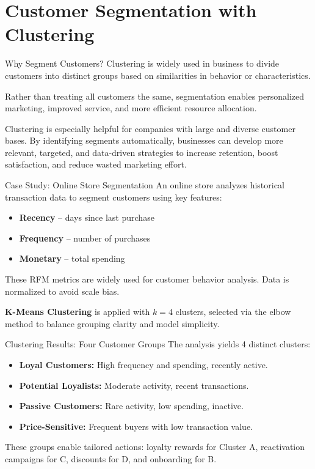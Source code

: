 \documentclass[aspectratio=169, table]{beamer}
\begin{document}
\section{Customer Segmentation with Clustering}

\begin{frame}{Why Segment Customers?}
	Clustering is widely used in business to divide customers into distinct groups based on similarities in behavior or characteristics. 
	
	Rather than treating all customers the same, segmentation enables personalized marketing, improved service, and more efficient resource allocation. 
	
	Clustering is especially helpful for companies with large and diverse customer bases. By identifying segments automatically, businesses can develop more relevant, targeted, and data-driven strategies to increase retention, boost satisfaction, and reduce wasted marketing effort.
\end{frame}

\begin{frame}{Case Study: Online Store Segmentation}
	An online store analyzes historical transaction data to segment customers using key features:
	
	\begin{itemize}
		\item \textbf{Recency} – days since last purchase
		\item \textbf{Frequency} – number of purchases
		\item \textbf{Monetary} – total spending
	\end{itemize}
	
	These RFM metrics are widely used for customer behavior analysis. Data is normalized to avoid scale bias. 
	
	\textbf{K-Means Clustering} is applied with \(k = 4\) clusters, selected via the elbow method to balance grouping clarity and model simplicity.
\end{frame}

\begin{frame}{Clustering Results: Four Customer Groups}
	The analysis yields 4 distinct clusters:
	
	\begin{itemize}
		\item \textbf{Loyal Customers:} High frequency and spending, recently active.
		\item \textbf{Potential Loyalists:} Moderate activity, recent transactions.
		\item \textbf{Passive Customers:} Rare activity, low spending, inactive.
		\item \textbf{Price-Sensitive:} Frequent buyers with low transaction value.
	\end{itemize}
	
	These groups enable tailored actions: loyalty rewards for Cluster A, reactivation campaigns for C, discounts for D, and onboarding for B.
\end{frame}
\end{document}

